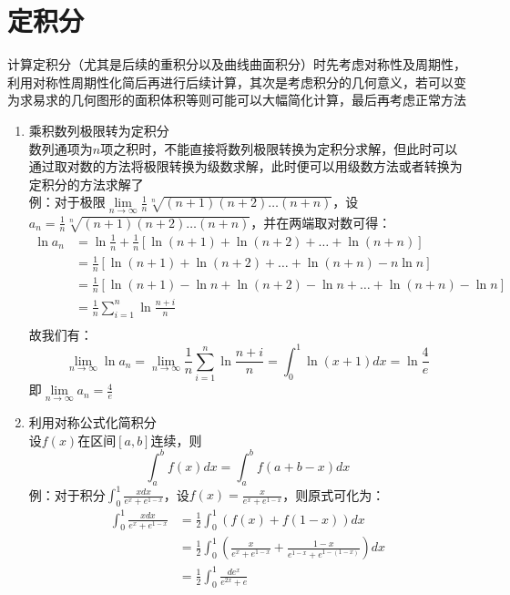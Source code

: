 \documentclass[12pt,a4paper,UTF8]{book}
\begin{document}
\section{定积分}
计算定积分（尤其是后续的重积分以及曲线曲面积分）时先考虑对称性及周期性，利用对称性周期性化简后再进行后续计算，其次是考虑积分的几何意义，若可以变为求易求的几何图形的面积体积等则可能可以大幅简化计算，最后再考虑正常方法
\begin{enumerate}
\item 乘积数列极限转为定积分\\
数列通项为$n$项之积时，不能直接将数列极限转换为定积分求解，但此时可以通过取对数的方法将极限转换为级数求解，此时便可以用级数方法或者转换为定积分的方法求解了\\
例：对于极限$\lim\limits_{n\to \infty}\frac{1}{n}\sqrt[n]{\left(n+1\right)\left(n+2\right)\ldots\left(n+n\right)}$，设$a_n=\frac{1}{n}\sqrt[n]{\left(n+1\right)\left(n+2\right)\ldots\left(n+n\right)}$，并在两端取对数可得：
\[\begin{aligned}
\ln a_n&=\ln\frac{1}{n}+\frac{1}{n}\left[\ln\left(n+1\right)+\ln\left(n+2\right)+\ldots+\ln\left(n+n\right)\right]\\
&=\frac{1}{n}\left[\ln\left(n+1\right)+\ln\left(n+2\right)+\ldots+\ln\left(n+n\right)-n\ln n\right]\\
&=\frac{1}{n}\left[\ln\left(n+1\right)-\ln n+\ln\left(n+2\right)-\ln n+\ldots+\ln\left(n+n\right)-\ln n\right]\\
&=\frac{1}{n}\sum\limits_{i=1}^n\ln\frac{n+i}{n}\\
\end{aligned}\]
故我们有：
\[\lim\limits_{n\to\infty}\ln a_n=\lim\limits_{n\to\infty}\frac{1}{n}\sum\limits_{i=1}^n\ln\frac{n+i}{n}=\int_0^1\ln\left(x+1\right)dx=\ln\frac{4}{e}\]
即$\lim\limits_{n\to\infty}a_n=\frac{4}{e}$
\item 利用对称公式化简积分\\
\normalsize 设$f\left(x\right)$在区间$\left[a,b\right]$连续，则
\[\int_a^bf\left(x\right)dx=\int_a^bf\left(a+b-x\right)dx\]
例：对于积分$\int_0^1\frac{xdx}{e^x+e^{1-x}}$，设$f\left(x\right)=\frac{x}{e^x+e^{1-x}}$，则原式可化为：
\[\begin{aligned}
\int_0^1\frac{xdx}{e^x+e^{1-x}}&=\frac{1}{2}\int_0^1\left(f\left(x\right)+f\left(1-x\right)\right)dx\\
&=\frac{1}{2}\int_0^1\left(\frac{x}{e^x+e^{1-x}}+\frac{1-x}{e^{1-x}+e^{1-\left(1-x\right)}}\right)dx\\
&=\frac{1}{2}\int_0^1\frac{de^x}{e^{2x}+e}\\

\end{aligned}\]
\end{enumerate}
\end{document}
